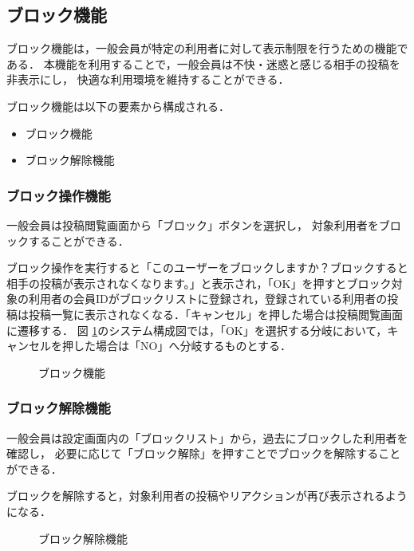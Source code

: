 \subsection{ブロック機能}
ブロック機能は，一般会員が特定の利用者に対して表示制限を行うための機能である．
本機能を利用することで，一般会員は不快・迷惑と感じる相手の投稿を非表示にし，
快適な利用環境を維持することができる．

ブロック機能は以下の要素から構成される．

\begin{itemize}
  \item ブロック機能
  \item ブロック解除機能
\end{itemize}

\subsubsection{ブロック操作機能}
一般会員は投稿閲覧画面から「ブロック」ボタンを選択し，
対象利用者をブロックすることができる．

ブロック操作を実行すると「このユーザーをブロックしますか？ブロックすると相手の投稿が表示されなくなります。」と表示され，「OK」を押すとブロック対象の利用者の会員IDがブロックリストに登録され，登録されている利用者の投稿は投稿一覧に表示されなくなる．「キャンセル」を押した場合は投稿閲覧画面に遷移する．
図 \ref{fig:block_gene}のシステム構成図では，「OK」を選択する分岐において，キャンセルを押した場合は「NO」へ分岐するものとする．

\begin{figure}[H]
    \centering
    
    \caption{ブロック機能}
    \label{fig:block_gene}
\end{figure}


\subsubsection{ブロック解除機能}
一般会員は設定画面内の「ブロックリスト」から，過去にブロックした利用者を確認し，
必要に応じて「ブロック解除」を押すことでブロックを解除することができる．

ブロックを解除すると，対象利用者の投稿やリアクションが再び表示されるようになる．

\begin{figure}[H]
    \centering
    
    \caption{ブロック解除機能}
    \label{fig:unblock_gene}
\end{figure}

